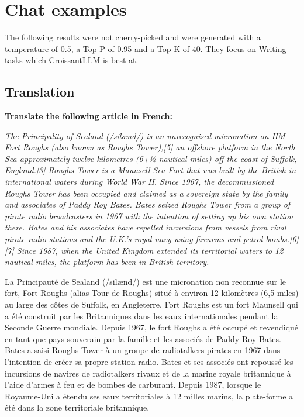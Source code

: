 \section{Chat examples}

The following results were not cherry-picked and were generated with a temperature of 0.5, a Top-P of 0.95 and a Top-K of 40. They focus on Writing tasks which CroissantLLM is best at.

\subsection{Translation}

\begin{promptkaobox}[frametitle=Prompt]
\textbf{Translate the following article in French:}

\textit{The Principality of Sealand (/silænd/) is an unrecognised micronation on HM Fort Roughs (also known as Roughs Tower),[5] an offshore platform in the North Sea approximately twelve kilometres (6+1⁄2 nautical miles) off the coast of Suffolk, England.[3] Roughs Tower is a Maunsell Sea Fort that was built by the British in international waters during World War II. Since 1967, the decommissioned Roughs Tower has been occupied and claimed as a sovereign state by the family and associates of Paddy Roy Bates. Bates seized Roughs Tower from a group of pirate radio broadcasters in 1967 with the intention of setting up his own station there. Bates and his associates have repelled incursions from vessels from rival pirate radio stations and the U.K.'s royal navy using firearms and petrol bombs.[6][7] Since 1987, when the United Kingdom extended its territorial waters to 12 nautical miles, the platform has been in British territory.}
\end{promptkaobox}

\begin{completionkaobox}[frametitle=CroissantLLMChat]
La Principauté de Sealand (/silænd/) est une micronation non reconnue sur le fort, Fort Roughs (alias Tour de Roughs) situé à environ 12 kilomètres (6,5 miles) au large des côtes de Suffolk, en Angleterre. Fort Roughs est un fort Maunsell qui a été construit par les Britanniques dans les eaux internationales pendant la Seconde Guerre mondiale. Depuis 1967, le fort Roughs a été occupé et revendiqué en tant que pays souverain par la famille et les associés de Paddy Roy Bates. Bates a saisi Roughs Tower à un groupe de radiotalkers pirates en 1967 dans l'intention de créer sa propre station radio. Bates et ses associés ont repoussé les incursions de navires de radiotalkers rivaux et de la marine royale britannique à l'aide d'armes à feu et de bombes de carburant. Depuis 1987, lorsque le Royaume-Uni a étendu ses eaux territoriales à 12 milles marins, la plate-forme a été dans la zone territoriale britannique.
\end{completionkaobox}

